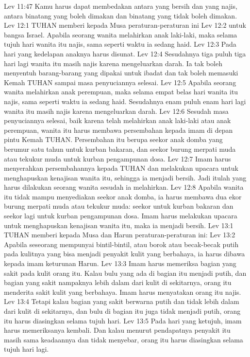 Lev 11:47  Kamu harus dapat membedakan antara yang bersih dan yang najis, antara binatang yang boleh dimakan dan binatang yang tidak boleh dimakan.
Lev 12:1  TUHAN memberi kepada Musa peraturan-peraturan ini
Lev 12:2  untuk bangsa Israel. Apabila seorang wanita melahirkan anak laki-laki, maka selama tujuh hari wanita itu najis, sama seperti waktu ia sedang haid.
Lev 12:3  Pada hari yang kedelapan anaknya harus disunat.
Lev 12:4  Sesudahnya tiga puluh tiga hari lagi wanita itu masih najis karena mengeluarkan darah. Ia tak boleh menyentuh barang-barang yang dipakai untuk ibadat dan tak boleh memasuki Kemah TUHAN sampai masa penyuciannya selesai.
Lev 12:5  Apabila seorang wanita melahirkan anak perempuan, maka selama empat belas hari wanita itu najis, sama seperti waktu ia sedang haid. Sesudahnya enam puluh enam hari lagi wanita itu masih najis karena mengeluarkan darah.
Lev 12:6  Sesudah masa penyuciannya selesai, baik karena telah melahirkan anak laki-laki atau anak perempuan, wanita itu harus membawa persembahan kepada imam di depan pintu Kemah TUHAN. Persembahan itu berupa seekor anak domba yang berumur satu tahun untuk kurban bakaran, dan seekor burung merpati muda atau tekukur muda untuk kurban pengampunan dosa.
Lev 12:7  Imam harus menyerahkan persembahannya kepada TUHAN dan melakukan upacara untuk menghapuskan kenajisan wanita itu, sehingga ia menjadi bersih. Jadi itulah yang harus dilakukan seorang wanita sesudah ia melahirkan.
Lev 12:8  Apabila wanita itu tidak mampu menyediakan seekor anak domba, ia harus membawa dua ekor burung merpati muda atau tekukur muda: seekor untuk kurban bakaran dan seekor lagi untuk kurban pengampunan dosa. Imam harus melakukan upacara untuk menghapuskan kenajisan wanita itu, maka ia menjadi bersih.
Lev 13:1  TUHAN memberi kepada Musa dan Harun peraturan-peraturan ini:
Lev 13:2  Apabila seseorang mempunyai bintil-bintil, atau borok atau becak-becak putih pada kulitnya yang bisa menjadi penyakit kulit yang berbahaya, ia harus dibawa kepada imam keturunan Harun.
Lev 13:3  Imam harus memeriksa bagian yang sakit pada kulit orang itu. Kalau bulu yang ada di bagian itu menjadi putih, dan bagian yang sakit nampaknya lebih dalam dari kulit di sekitarnya, orang itu menderita sakit kulit yang berbahaya. Imam harus menyatakan orang itu najis.
Lev 13:4  Tetapi kalau bagian yang sakit berwarna putih dan tidak lebih dalam dari kulit di sekitarnya, dan bulu di bagian itu juga tidak menjadi putih, orang itu harus diasingkan selama tujuh hari.
Lev 13:5  Pada hari yang ketujuh, imam harus memeriksanya kembali. Dan kalau menurut pendapatnya penyakit itu masih sama keadaannya dan tidak menyebar, orang itu harus diasingkan selama tujuh hari lagi.
